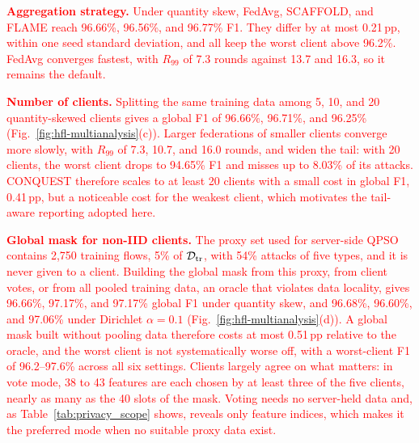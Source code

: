 \documentclass[conference]{IEEEtran}
\begin{document}
\textcolor{red}{\textbf{Aggregation
strategy.} Under quantity skew, FedAvg, SCAFFOLD, and FLAME reach
96.66\%, 96.56\%, and 96.77\% F1. They differ by at most 0.21\,pp,
within one seed standard deviation, and all keep the worst client
above 96.2\%. FedAvg converges fastest, with $R_{99}$ of 7.3 rounds
against 13.7 and 16.3, so it remains the default.}

\textcolor{red}{\textbf{Number of clients.} Splitting the
same training data among 5, 10, and 20 quantity-skewed clients gives a
global F1 of 96.66\%, 96.71\%, and 96.25\%
(Fig.~\ref{fig:hfl-multianalysis}(c)). Larger federations of smaller
clients converge more slowly, with $R_{99}$ of 7.3, 10.7, and 16.0
rounds, and widen the tail: with 20 clients, the worst client drops to
94.65\% F1 and misses up to 8.03\% of its attacks. CONQUEST therefore
scales to at least 20 clients with a small cost in global F1,
0.41\,pp, but a noticeable cost for the weakest client, which
motivates the tail-aware reporting adopted here.}

\textcolor{red}{\textbf{Global mask for non-IID clients.}
The proxy set used for server-side QPSO contains 2{,}750 training
flows, 5\% of $\mathcal{D}_{\rm tr}$, with 54\% attacks of five types,
and it is never given to a client. Building the global mask from this
proxy, from client votes, or from all pooled training data, an oracle
that violates data locality, gives 96.66\%, 97.17\%, and 97.17\%
global F1 under quantity skew, and 96.68\%, 96.60\%, and 97.06\% under
Dirichlet $\alpha=0.1$ (Fig.~\ref{fig:hfl-multianalysis}(d)). A
global mask built without pooling data therefore costs at most
0.51\,pp relative to the oracle, and the worst client is not
systematically worse off, with a worst-client F1 of 96.2--97.6\%
across all six settings. Clients largely agree on what matters: in
vote mode, 38 to 43 features are each chosen by at least three of the
five clients, nearly as many as the 40 slots of the mask. Voting needs no server-held data and,
as Table~\ref{tab:privacy_scope} shows, reveals only feature indices,
which makes it the preferred mode when no suitable proxy data exist.}
\end{document}
